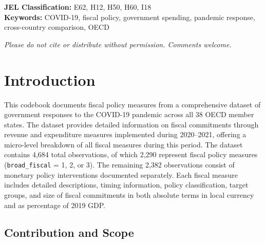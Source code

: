 \documentclass[12pt]{article}
\begin{document}
\begin{titlepage}
\begin{center}
\begin{minipage}{0.85\textwidth}
\end{minipage}

\vspace{1.5cm}

\begin{minipage}{0.85\textwidth}
\textbf{JEL Classification:} E62, H12, H50, H60, I18\\[0.3cm]
\textbf{Keywords:} COVID-19, fiscal policy, government spending, pandemic response, cross-country comparison, OECD
\end{minipage}


\vfill

\begin{minipage}{0.85\textwidth}
\centering
\footnotesize
\textit{Please do not cite or distribute without permission. Comments welcome.}
\end{minipage}

\end{center}
\end{titlepage}




\tableofcontents
\newpage

\section{Introduction}

This codebook documents fiscal policy measures from a comprehensive dataset of government responses to the COVID-19 pandemic across all 38 OECD member states. The dataset provides detailed information on fiscal commitments through revenue and expenditure measures implemented during 2020--2021, offering a micro-level breakdown of all fiscal measures during this period. The dataset contains 4,684 total observations, of which 2,290 represent fiscal policy measures (\texttt{broad\_fiscal} = 1, 2, or 3). The remaining 2,382 observations consist of monetary policy interventions documented separately. Each fiscal measure includes detailed descriptions, timing information, policy classification, target groups, and size of fiscal commitments in both absolute terms in local currency and as percentage of 2019 GDP.

\subsection{Contribution and Scope}
\end{document}
